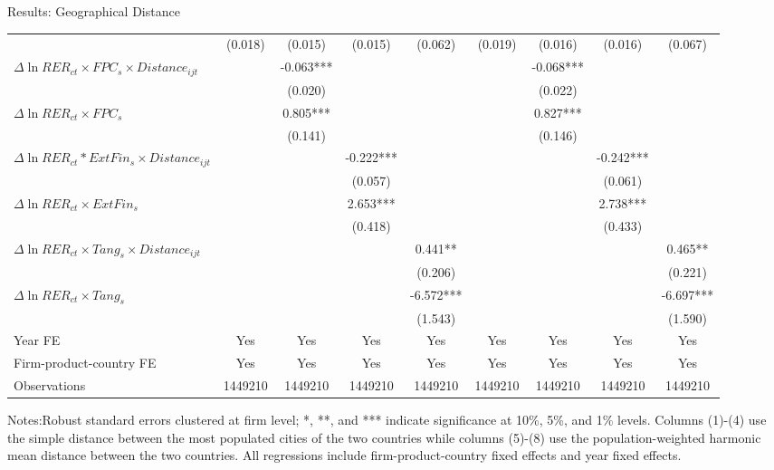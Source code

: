 \documentclass[10pt]{beamer}
\begin{document}
\begin{frame}{Results: Geographical Distance}
\begin{table}[htbp]
{\begin{threeparttable}
\begin{tabular}{lcccccccc}
			& (0.018) & (0.015) & (0.015) & (0.062) & (0.019) & (0.016) & (0.016) & (0.067) \\
			$\Delta \ln RER_{ct} \times FPC_{s} \times Distance_{ijt}$ &    & -0.063*** &       &     &       & -0.068*** &   &  \\
			&   & (0.020) &       &       &       & (0.022) &       &  \\
			$\Delta \ln RER_{ct} \times FPC_{s}$ &    & 0.805*** &       &       &       & 0.827*** &       &  \\
			&     & (0.141) &       &       &       & (0.146) &       &  \\
			$\Delta \ln RER_{ct}*ExtFin_{s} \times Distance_{ijt}$ &    &       & -0.222*** &       &       &       & -0.242*** &  \\
			&    &       & (0.057) &       &       &       & (0.061) &  \\
			$\Delta \ln RER_{ct} \times ExtFin_{s}$ &    &       & 2.653*** &       &       &       & 2.738*** &  \\
			&    &       & (0.418) &       &       &       & (0.433) &  \\
			$\Delta \ln RER_{ct} \times Tang_{s} \times Distance_{ijt}$ &     &       &       & 0.441** &       &       &       & 0.465** \\
			&    &       &       & (0.206) &       &       &       & (0.221) \\
			$\Delta \ln RER_{ct} \times Tang_{s}$ &    &       &       & -6.572*** &       &       &       & -6.697*** \\
			&     &       &       & (1.543) &       &       &       & (1.590) \\
			Year FE  & Yes   & Yes   & Yes   & Yes & Yes   & Yes   & Yes   & Yes\\
			Firm-product-country FE & Yes   & Yes   & Yes   & Yes & Yes   & Yes   & Yes   & Yes\\
			Observations & 1449210 & 1449210 & 1449210 & 1449210 & 1449210 & 1449210 & 1449210 & 1449210\\
			\bottomrule
		\end{tabular}
		\begin{tablenotes}
			\footnotesize
			\item Notes:Robust standard errors clustered at firm level; *, **, and *** indicate significance at 10\%, 5\%, and 1\% levels. Columns (1)-(4) use the simple distance between the most populated cities of the two countries while columns (5)-(8) use the population-weighted harmonic mean distance between the two countries. All regressions include firm-product-country fixed effects and year fixed effects.
		\end{tablenotes}
	\end{threeparttable}
	}
	\label{tab.source.distance}
    
    \end{table}
    \hyperlink{tab.source}{}
\end{frame}
\end{document}
